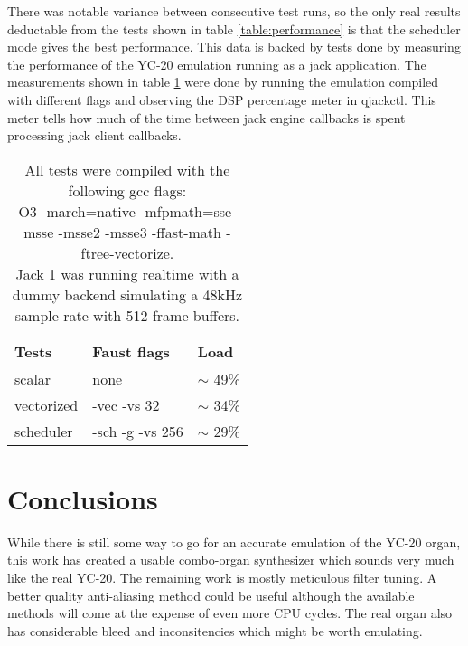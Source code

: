 \documentclass[11pt,a4paper]{article}
\begin{document}
There was notable variance between consecutive test runs, so the only real results deductable from the tests shown in table \ref{table:performance} is that the scheduler mode gives the best performance. This data is backed by tests done by measuring the performance of the YC-20 emulation running as a jack application. The measurements shown in table \ref{table:performance2} were done by running the emulation compiled with different flags and observing the DSP percentage meter in qjackctl. This meter tells how much of the time between jack engine callbacks is spent processing jack client callbacks.

\begin{table}[h]
 \begin{center}
\begin{tabular}{|l|l|l|}

      \hline
      Tests         & Faust flags & Load   \\
      \hline\hline
      scalar        & none & $\sim$ 49\% \\
      vectorized    & -vec -vs 32 & $\sim$ 34\% \\
      scheduler     & -sch -g -vs 256 & $\sim$ 29\% \\
      \hline

\end{tabular}
\caption{All tests were compiled with the following gcc flags: \\
-O3 -march=native -mfpmath=sse -msse -msse2 -msse3 -ffast-math -ftree-vectorize. \\
Jack 1 was running realtime with a dummy backend simulating a 48kHz sample rate with 512 frame buffers.
}\label{table:performance2}
 \end{center}
\end{table}



\section{Conclusions}

While there is still some way to go for an accurate emulation of the YC-20 organ, this work has created a usable combo-organ synthesizer which sounds very much like the real YC-20. The remaining work is mostly meticulous filter tuning. A better quality anti-aliasing method could be useful although the available methods will come at the expense of even more CPU cycles. The real organ also has considerable bleed and inconsitencies which might be worth emulating.
\end{document}
